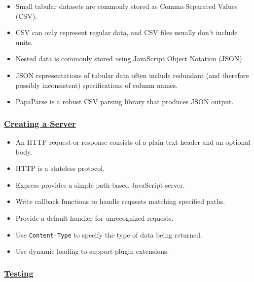 \begin{itemize}
\tightlist
\item
  Small tabular datasets are commonly stored as Comma-Separated Values
  (CSV).
\item
  CSV can only represent regular data, and CSV files usually don't
  include units.
\item
  Nested data is commonly stored using JavaScript Object Notation
  (JSON).
\item
  JSON representations of tabular data often include redundant (and
  therefore possibly inconsistent) specifications of column names.
\item
  PapaParse is a robust CSV parsing library that produces JSON output.
\end{itemize}

\subsubsection{\texorpdfstring{\protect\hyperlink{s:server}{Creating a
Server}}{Creating a Server}}\label{null}

\begin{itemize}
\tightlist
\item
  An HTTP request or response consists of a plain-text header and an
  optional body.
\item
  HTTP is a stateless protocol.
\item
  Express provides a simple path-based JavaScript server.
\item
  Write callback functions to handle requests matching specified paths.
\item
  Provide a default handler for unrecognized requests.
\item
  Use \texttt{Content-Type} to specify the type of data being returned.
\item
  Use dynamic loading to support plugin extensions.
\end{itemize}

\subsubsection{\texorpdfstring{\protect\hyperlink{s:testing}{Testing}}{Testing}}\label{null}

